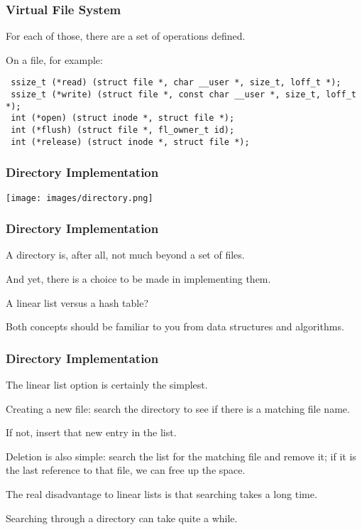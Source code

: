 \begin{frame}[fragile]
\frametitle{Virtual File System}

For each of those, there are a set of operations defined. 

On a file, for example:
{\scriptsize
\begin{verbatim}
 ssize_t (*read) (struct file *, char __user *, size_t, loff_t *);
 ssize_t (*write) (struct file *, const char __user *, size_t, loff_t *); 
 int (*open) (struct inode *, struct file *);
 int (*flush) (struct file *, fl_owner_t id);
 int (*release) (struct inode *, struct file *);
\end{verbatim}
}

\end{frame}

\begin{frame}
\frametitle{Directory Implementation}

\begin{center}
	\texttt{[image: images/directory.png]}
\end{center}

\end{frame}



\begin{frame}
\frametitle{Directory Implementation}

A directory is, after all, not much beyond a set of files. 

And yet, there is a choice to be made in implementing them.

A linear list versus a hash table? 

Both concepts should be familiar to you from data structures and algorithms.


\end{frame}

\begin{frame}
\frametitle{Directory Implementation}

The linear list option is certainly the simplest. 

Creating a new file: search the directory to see if there is a matching file name. 

If not, insert that new entry in the list. 

Deletion is also simple: search the list for the matching file and remove it; if it is the last reference to that file, we can free up the space. 

The real disadvantage to linear lists is that searching takes a long time. 

Searching through a directory can take quite a while.

\end{frame}

